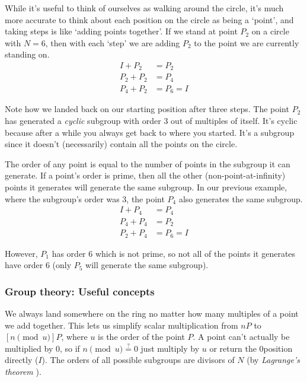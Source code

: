 While it's useful to think of ourselves as walking around the circle, it's much more accurate to think about each position on the circle as being a `point', and taking steps is like `adding points together'. If we stand at point $P_2$ on a circle with $N = 6$, then with each `step' we are adding $P_2$ to the point we are currently standing on.\vspace{.115cm}
\begin{align*}
    I + P_2 &= P_2 \\
    P_2 + P_2 &= P_4 \\
    P_4 + P_2 &= P_6 = I
\end{align*}

Note how we landed back on our starting position after three steps. The point $P_2$ has generated a {\em cyclic} subgroup with order 3 out of multiples of itself. It's cyclic because after a while you always get back to where you started. It's a subgroup since it doesn't (necessarily) contain all the points on the circle.

The order of any point is equal to the number of points in the subgroup it can generate. If a point's order is prime, then all the other (non-point-at-infinity) points it generates will generate the same subgroup. In our previous example, where the subgroup's order was 3, the point $P_4$ also generates the same subgroup.
\begin{align*}
    I + P_4 &= P_4 \\
    P_4 + P_4 &= P_2 \\
    P_2 + P_4 &= P_6 = I
\end{align*}

However, $P_1$ has order 6 which is not prime, so not all of the points it generates have order 6 (only $P_5$ will generate the same subgroup).

\subsubsection{Group theory: Useful concepts}

We always land somewhere on the ring no matter how many multiples of a point we add together. This lets us simplify scalar multiplication from $nP$ to $[n \pmod u] P$, where $u$ is the order of the point $P$. A point can't actually be multiplied by 0, so if $n \pmod u \stackrel{?}{=} 0$ just multiply by $u$ or return the 0\nth position directly ($I$). The orders of all possible subgroups are divisors of $N$ (by {\em Lagrange’s theorem} \cite{lagranges-theorem}).

